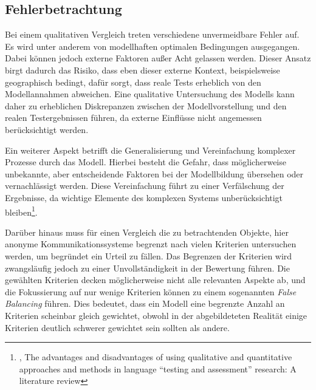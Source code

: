 \subsection{Fehlerbetrachtung}

Bei einem qualitativen Vergleich treten verschiedene unvermeidbare Fehler auf. Es wird unter anderem von modellhaften optimalen Bedingungen ausgegangen. Dabei können jedoch externe Faktoren außer Acht gelassen werden. Dieser Ansatz birgt dadurch das Risiko, dass eben dieser externe Kontext, beispielsweise geographisch bedingt, dafür sorgt, dass reale Tests erheblich von den Modellannahmen abweichen. Eine qualitative Untersuchung des Modells kann daher zu erheblichen Diskrepanzen zwischen der Modellvorstellung und den realen Testergebnissen führen, da externe Einflüsse nicht angemessen berücksichtigt werden.

Ein weiterer Aspekt betrifft die Generalisierung und Vereinfachung komplexer Prozesse durch das Modell. Hierbei besteht die Gefahr, dass möglicherweise unbekannte, aber entscheidende Faktoren bei der Modellbildung übersehen oder vernachlässigt werden. Diese Vereinfachung führt zu einer Verfälschung der Ergebnisse, da wichtige Elemente des komplexen Systems unberücksichtigt bleiben\footnote{\cite{DisadvantagesOfQualitativApproaches}, The advantages and disadvantages of using qualitative and quantitative approaches and methods in language “testing and assessment” research: A literature review}.

Darüber hinaus muss für einen Vergleich die zu betrachtenden Objekte, hier anonyme Kommunikationssysteme begrenzt nach vielen Kriterien untersuchen werden, um begründet ein Urteil zu fällen. Das Begrenzen der Kriterien wird zwangsläufig jedoch zu einer Unvollständigkeit in der Bewertung führen. Die gewählten Kriterien decken möglicherweise nicht alle relevanten Aspekte ab, und die Fokussierung auf nur wenige Kriterien können zu einem sogenannten \textit{False Balancing} führen. Dies bedeutet, dass ein Modell eine begrenzte Anzahl an Kriterien scheinbar gleich gewichtet, obwohl in der abgebildeteten Realität einige Kriterien deutlich schwerer gewichtet sein sollten als andere.